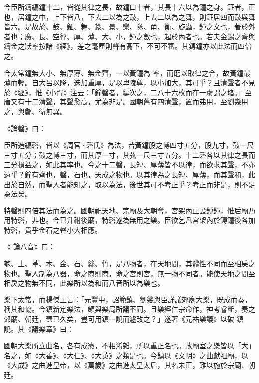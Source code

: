 \begin{pinyinscope}
 今臣所鑄編鐘十二，皆從其律之長，故鐘口十者，其長十六以為鐘之身。鉦者，正也，居鐘之中，上下皆八，下去二以為之鼓，上去二以為之舞，則鉦居四而鼓與舞皆六。是故於、鼓、鉦、舞、篆、景、欒、隊、甬、衡、旋蟲，鐘之文也，著於外者也；廣、長、空徑、厚、薄、大、小，鐘之數也，起於內者也。若夫金錫之齊與鑄金之狀率按諸《經》，差之毫厘則聲有高下，不可不審。其鎛鐘亦以此法而四倍之。



 今太常鐘無大小、無厚薄、無金齊，一以黃鐘為
 率，而磨以取律之合，故黃鐘最薄而輕。自大呂以降，迭加重厚，是以卑陵尊，以小加大，其可乎？且清聲者不見於《經》，惟《小胥》注云：「鐘磬者，編次之，二八十六枚而在一虡謂之堵。」至唐又有十二清聲，其聲愈高，尤為非是。國朝舊有四清聲，置而弗用，至劉幾用之，與鄭、衛無異。



 《論磬》曰：



 臣所造編磬，皆以《周官·磬氏》為法，若黃鐘股之博四寸五分，股九寸，鼓一尺三寸五分；鼓之博三寸，而其厚一寸，其弦一尺三寸五分。十二磬各以其律之長而
 三分損益之，如此其率也。今之十二磬，長短、厚薄皆不以律，而欲求其聲，不亦遠乎？鐘有齊也，磬，石也，天成之物也。以其律為之長短、厚薄，而其聲和，此出於自然，而聖人者能知之，取以為法，後世其可不考正乎？考正而非是，則不足為法矣。



 特磬則四倍其法而為之。國朝祀天地、宗廟及大朝會，宮架內止設鎛鐘，惟后廟乃用特磬，非也。今已升祔後廟，特磬遂為無用之樂。臣欲乞凡宮架內於鎛鐘後各加特磬，貴乎金石之聲小大相應。



 《
 論八音》曰：



 匏、土、革、木、金、石、絲、竹，是八物者，在天地間，其體性不同而至相戾之物也。聖人制為八器，命之商則商，命之宮則宮，無一物不同者。能使天地之間至相戾之物無不同，此樂所以為和而八音所以為樂也。



 樂下太常，而楊傑上言：「元豐中，詔範鎮、劉幾與臣詳議郊廟大樂，既成而奏，稱其和協。今鎮新定樂法，頗與樂局所議不同。且樂經仁宗命作，神考睿斷，奏之郊廟、朝廷，蓋已久矣，豈可用鎮一說而遽改之？」遂著《元祐樂議》以破
 鎮說。其《議樂章》曰：



 國朝大樂所立曲名，各有成憲，不相淆雜，所以重正名也。故廟室之樂皆以「大」名之，如《大善》、《大仁》、《大英》之類是也。今鎮以《文明》之曲獻祖廟，以《大成》之曲進皇帝，以《萬歲》之曲進太皇太后，其名未正，難以施於宗廟、朝廷。




\end{pinyinscope}
